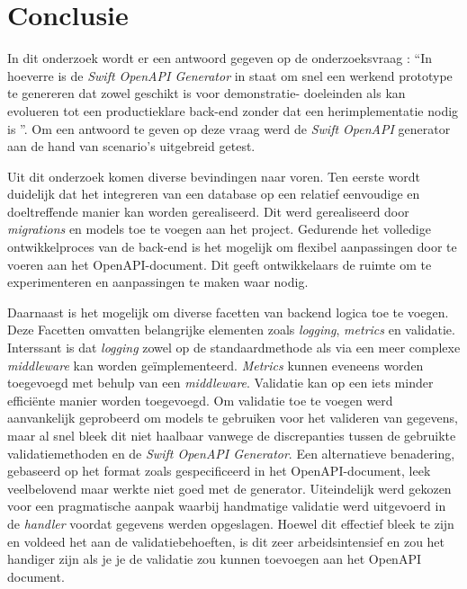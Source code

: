 
\chapter{Conclusie}%
\label{ch:conclusie}

In dit onderzoek wordt er een antwoord gegeven op de onderzoeksvraag : “In hoeverre is de \textit{Swift OpenAPI Generator} in staat om snel een werkend prototype te genereren dat zowel geschikt is voor demonstratie- doeleinden als kan evolueren tot een productieklare back-end zonder dat een herimplementatie nodig is ”. Om een antwoord te geven op deze vraag werd de \textit{Swift OpenAPI} generator aan de hand van scenario’s uitgebreid getest. 

Uit dit onderzoek komen diverse bevindingen naar voren. Ten eerste wordt duidelijk dat het integreren van een database op een relatief eenvoudige en doeltreffende manier kan worden gerealiseerd. Dit werd gerealiseerd door \textit{migrations} en models toe te voegen aan het project. Gedurende het volledige ontwikkelproces van de back-end is het mogelijk om flexibel aanpassingen door te voeren aan het OpenAPI-document. Dit geeft ontwikkelaars de ruimte om te experimenteren en aanpassingen te maken waar nodig. 

Daarnaast is het mogelijk om diverse facetten van backend logica toe te voegen. Deze Facetten omvatten belangrijke elementen zoals \textit{logging}, \textit{metrics} en validatie. Interssant is dat \textit{logging} zowel op de standaardmethode als via een meer complexe \textit{middleware} kan worden geïmplementeerd. \textit{Metrics} kunnen eveneens worden toegevoegd met behulp van een \textit{middleware}. Validatie kan op een iets minder efficiënte manier worden toegevoegd. 
Om validatie toe te voegen werd aanvankelijk geprobeerd om models te gebruiken voor het valideren van gegevens, maar al snel bleek dit niet haalbaar vanwege de discrepanties tussen de gebruikte validatiemethoden en de \textit{Swift OpenAPI Generator}. Een alternatieve benadering, gebaseerd op het format zoals gespecificeerd in het OpenAPI-document, leek veelbelovend maar werkte niet goed met de generator. 
Uiteindelijk werd gekozen voor een pragmatische aanpak waarbij handmatige validatie werd uitgevoerd in de \textit{handler} voordat gegevens werden opgeslagen. Hoewel dit effectief bleek te zijn en voldeed het aan de validatiebehoeften, is dit zeer arbeidsintensief en zou het handiger zijn als je je de validatie zou kunnen toevoegen aan het OpenAPI document. 

